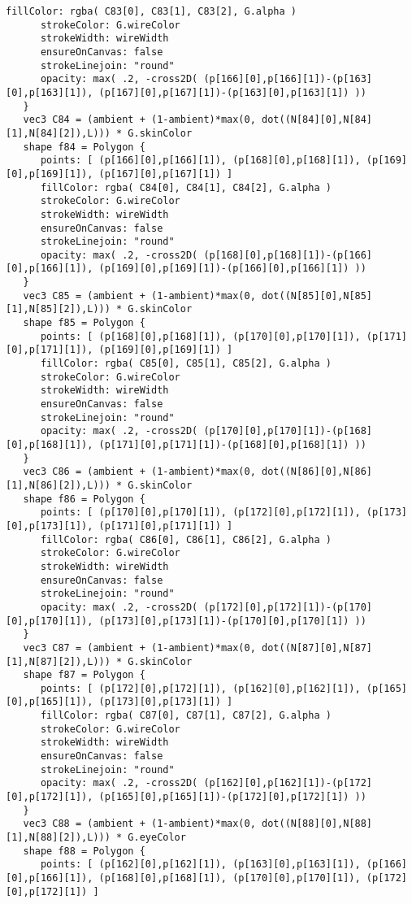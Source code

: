 \begin{lstlisting}[language=Sty-RT,escapechar=@]
      fillColor: rgba( C83[0], C83[1], C83[2], G.alpha )
      strokeColor: G.wireColor
      strokeWidth: wireWidth
      ensureOnCanvas: false
      strokeLinejoin: "round"
      opacity: max( .2, -cross2D( (p[166][0],p[166][1])-(p[163][0],p[163][1]), (p[167][0],p[167][1])-(p[163][0],p[163][1]) ))
   }
   vec3 C84 = (ambient + (1-ambient)*max(0, dot((N[84][0],N[84][1],N[84][2]),L))) * G.skinColor
   shape f84 = Polygon {
      points: [ (p[166][0],p[166][1]), (p[168][0],p[168][1]), (p[169][0],p[169][1]), (p[167][0],p[167][1]) ]
      fillColor: rgba( C84[0], C84[1], C84[2], G.alpha )
      strokeColor: G.wireColor
      strokeWidth: wireWidth
      ensureOnCanvas: false
      strokeLinejoin: "round"
      opacity: max( .2, -cross2D( (p[168][0],p[168][1])-(p[166][0],p[166][1]), (p[169][0],p[169][1])-(p[166][0],p[166][1]) ))
   }
   vec3 C85 = (ambient + (1-ambient)*max(0, dot((N[85][0],N[85][1],N[85][2]),L))) * G.skinColor
   shape f85 = Polygon {
      points: [ (p[168][0],p[168][1]), (p[170][0],p[170][1]), (p[171][0],p[171][1]), (p[169][0],p[169][1]) ]
      fillColor: rgba( C85[0], C85[1], C85[2], G.alpha )
      strokeColor: G.wireColor
      strokeWidth: wireWidth
      ensureOnCanvas: false
      strokeLinejoin: "round"
      opacity: max( .2, -cross2D( (p[170][0],p[170][1])-(p[168][0],p[168][1]), (p[171][0],p[171][1])-(p[168][0],p[168][1]) ))
   }
   vec3 C86 = (ambient + (1-ambient)*max(0, dot((N[86][0],N[86][1],N[86][2]),L))) * G.skinColor
   shape f86 = Polygon {
      points: [ (p[170][0],p[170][1]), (p[172][0],p[172][1]), (p[173][0],p[173][1]), (p[171][0],p[171][1]) ]
      fillColor: rgba( C86[0], C86[1], C86[2], G.alpha )
      strokeColor: G.wireColor
      strokeWidth: wireWidth
      ensureOnCanvas: false
      strokeLinejoin: "round"
      opacity: max( .2, -cross2D( (p[172][0],p[172][1])-(p[170][0],p[170][1]), (p[173][0],p[173][1])-(p[170][0],p[170][1]) ))
   }
   vec3 C87 = (ambient + (1-ambient)*max(0, dot((N[87][0],N[87][1],N[87][2]),L))) * G.skinColor
   shape f87 = Polygon {
      points: [ (p[172][0],p[172][1]), (p[162][0],p[162][1]), (p[165][0],p[165][1]), (p[173][0],p[173][1]) ]
      fillColor: rgba( C87[0], C87[1], C87[2], G.alpha )
      strokeColor: G.wireColor
      strokeWidth: wireWidth
      ensureOnCanvas: false
      strokeLinejoin: "round"
      opacity: max( .2, -cross2D( (p[162][0],p[162][1])-(p[172][0],p[172][1]), (p[165][0],p[165][1])-(p[172][0],p[172][1]) ))
   }
   vec3 C88 = (ambient + (1-ambient)*max(0, dot((N[88][0],N[88][1],N[88][2]),L))) * G.eyeColor
   shape f88 = Polygon {
      points: [ (p[162][0],p[162][1]), (p[163][0],p[163][1]), (p[166][0],p[166][1]), (p[168][0],p[168][1]), (p[170][0],p[170][1]), (p[172][0],p[172][1]) ]

\end{lstlisting}

